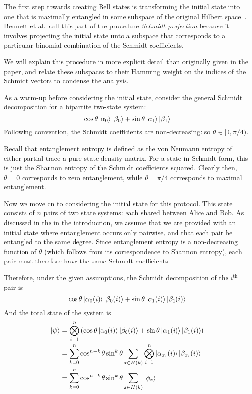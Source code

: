 The first step towards creating Bell states is transforming the initial state into one that is maximally entangled in some subspace of the original Hilbert space~\cite{bennett1996concentrating}.
Bennett et al.\ call this part of the procedure \emph{Schmidt projection} because it involves projecting the initial state unto a subspace that corresponds to a particular binomial combination of the Schmidt coefficients.

We will explain this procedure in more explicit detail than originally given in the paper, and relate these subspaces to their Hamming weight on the indices of the Schmidt vectors to condense the analysis.

As a warm-up before considering the initial state, consider the general Schmidt decomposition for a bipartite two-state system:
$$
\cos\theta \ket{\alpha_0} \ket{\beta_0} + 
\sin\theta \ket{\alpha_1} \ket{\beta_1}
$$
Following convention, the Schmidt coefficients are non-decreasing: so $\theta \in [0, \pi/4)$.

Recall that entanglement entropy is defined as the von Neumann entropy of either partial trace a pure state density matrix.
For a state in Schmidt form, this is just the Shannon entropy of the Schmidt coefficients squared.
Clearly then, $\theta = 0$ corresponds to zero entanglement, while $\theta = \pi/4$ corresponds to maximal entanglement.

Now we move on to considering the initial state for this protocol. This state consists of $n$ pairs of two state systems: each shared between Alice and Bob. As discussed in the in the introduction, we assume that we are provided with an initial state where entanglement occurs only pairwise, and that each pair be entangled to the same degree. Since entanglement entropy is a non-decreasing function of $\theta$  (which follows from its correspondence to Shannon entropy), each pair must therefore have the same Schmidt coefficients.

Therefore, under the given assumptions, the Schmidt decomposition of the $i^{\text{th}}$ pair is  
$$
\cos\theta \ket{\alpha_0(i)} \ket{\beta_0(i)} + 
\sin\theta \ket{\alpha_1(i)} \ket{\beta_1(i)}
$$
And the total state of the system is
\begin{align*}
	\ket{\psi} &= \bigotimes_{i=1}^n \left( 
	\cos\theta \ket{\alpha_0(i)} \ket{\beta_0(i)} + 
	\sin\theta \ket{\alpha_1(i)} \ket{\beta_1(i)} \right) \\
	&= \sum_{k=0}^n \cos^{n-k}\theta \sin^k\theta
	\sum_{x \in H(k)} \bigotimes_{i=1}^n 
	\ket{\alpha_{x_i}(i)} \ket{\beta_{x_i}(i)} \\
	&=  \sum_{k=0}^n \cos^{n-k}\theta \sin^k\theta
	\sum_{x \in H(k)} \ket{\phi_x}
\end{align*}

